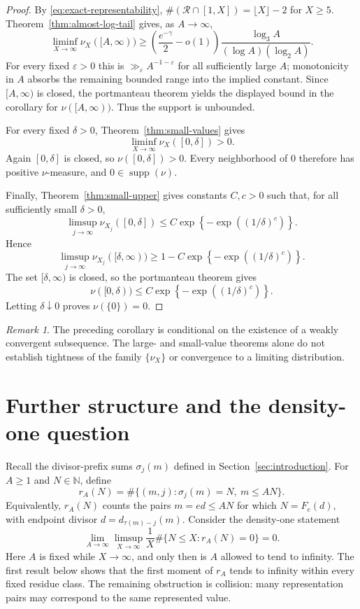 \documentclass[11pt]{article}
\theoremstyle{remark}
\newtheorem{remark}[theorem]{Remark}
\newcommand{\N}{\mathbb N}
\newcommand{\Rcal}{\mathcal R}
\newcommand{\eps}{\varepsilon}
\newcommand{\1}{\mathbf 1}
\DeclareMathOperator{\supp}{supp}
\begin{document}
\begin{proof}
By \eqref{eq:exact-representability},
$\#(\Rcal\cap[1,X])=\lfloor X\rfloor-2$ for $X\geq5$.
Theorem~\ref{thm:almost-log-tail} gives, as $A\to\infty$,
\[
 \liminf_{X\to\infty}\nu_X([A,\infty))
 \geq\left(\frac{e^{-\gamma}}2-o(1)\right)
       \frac{\log_3A}{(\log A)(\log_2A)}.
\]
For every fixed $\eps>0$ this is $\gg_\eps A^{-1-\eps}$ for all
sufficiently large $A$; monotonicity in $A$ absorbs the remaining bounded
range into the implied constant.  Since $[A,\infty)$ is closed, the
portmanteau theorem yields the displayed bound in the corollary for
$\nu([A,\infty))$.  Thus the support is unbounded.

For every fixed $\delta>0$, Theorem~\ref{thm:small-values} gives
\[
 \liminf_{X\to\infty}\nu_X([0,\delta])>0.
\]
Again $[0,\delta]$ is closed, so $\nu([0,\delta])>0$.  Every neighborhood
of $0$ therefore has positive $\nu$-measure, and $0\in\supp(\nu)$.

Finally, Theorem~\ref{thm:small-upper} gives constants $C,c>0$ such that,
for all sufficiently small $\delta>0$,
\[
 \limsup_{j\to\infty}\nu_{X_j}([0,\delta])
 \leq C\exp\!\left\{-\exp((1/\delta)^c)\right\}.
\]
Hence
\[
 \limsup_{j\to\infty}\nu_{X_j}([\delta,\infty))
 \geq1-C\exp\!\left\{-\exp((1/\delta)^c)\right\}.
\]
The set $[\delta,\infty)$ is closed, so the portmanteau theorem gives
\[
 \nu([0,\delta))
 \leq C\exp\!\left\{-\exp((1/\delta)^c)\right\}.
\]
Letting $\delta\downarrow0$ proves $\nu(\{0\})=0$.
\end{proof}

\begin{remark}
The preceding corollary is conditional on the existence of a weakly
convergent subsequence.  The large- and small-value theorems alone do not
establish tightness of the family $\{\nu_X\}$ or convergence to a limiting
distribution.
\end{remark}

\section{Further structure and the density-one question}\label{sec:tightness}

Recall the divisor-prefix sums $\sigma_j(m)$ defined in
Section~\ref{sec:introduction}.
For $A\geq1$ and $N\in\N$, define
\[
 r_A(N)=\#\{(m,j):\sigma_j(m)=N,\ m\leq AN\}.
\]
Equivalently, $r_A(N)$ counts the pairs $m=ed\leq AN$ for which
$N=F_e(d)$, with endpoint divisor $d=d_{\tau(m)-j}(m)$.
Consider the density-one statement
\begingroup
\renewcommand{\theequation}{T}
\begin{equation}\label{eq:T}
 \lim_{A\to\infty}\limsup_{X\to\infty}
 \frac1X\#\{N\leq X:r_A(N)=0\}=0.
\end{equation}
\endgroup
Here $A$ is fixed while $X\to\infty$, and only then is $A$ allowed to
tend to infinity.  The first result below shows that the first moment of
$r_A$ tends to infinity within every fixed residue class.  The remaining
obstruction is collision: many representation pairs may correspond to the
same represented value.
\end{document}
